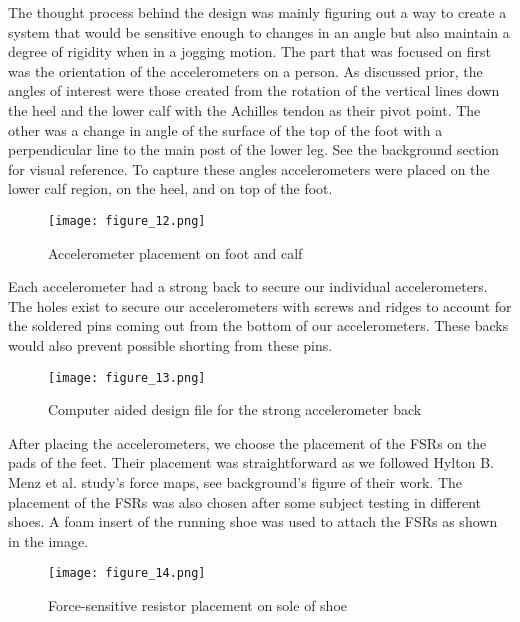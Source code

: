 The thought process behind the design was mainly figuring out a way to create a system that would be sensitive enough to changes in an angle but also maintain a degree of rigidity when in a jogging motion.
The part that was focused on first was the orientation of the accelerometers on a person.
As discussed prior, the angles of interest were those created from the rotation of the vertical lines down the heel and the lower calf with the Achilles tendon as their pivot point.
The other was a change in angle of the surface of the top of the foot with a perpendicular line to the main post of the lower leg.
See the background section for visual reference.
To capture these angles accelerometers were placed on the lower calf region, on the heel, and on top of the foot.\par

\begin{figure}[h]
  \centering
  \texttt{[image: figure\_12.png]}
  \caption[Accelerometer placement]{Accelerometer placement on foot and calf}
  \label{fig:x foot and calf}
\end{figure}

Each accelerometer had a strong back to secure our individual accelerometers.
The holes exist to secure our accelerometers with screws and ridges to account for the soldered pins coming out from the bottom of our accelerometers.
These backs would also prevent possible shorting from these pins.\par

\begin{figure}[h]
  \centering
  \texttt{[image: figure\_13.png]}
  \caption[CAD file]{Computer aided design file for the strong accelerometer back}
  \label{fig:x cad file}
\end{figure}

After placing the accelerometers, we choose the placement of the FSRs on the pads of the feet.
Their placement was straightforward as we followed Hylton B. Menz et al. study’s force maps, see background’s figure of their work.
The placement of the FSRs was also chosen after some subject testing in different shoes.
A foam insert of the running shoe was used to attach the FSRs as shown in the image.\par

\begin{figure}[h]
  \centering
  \texttt{[image: figure\_14.png]}
  \caption[FSR placement in shoe]{Force-sensitive resistor placement on sole of shoe}
  \label{fig:x fsr placement}
\end{figure}


